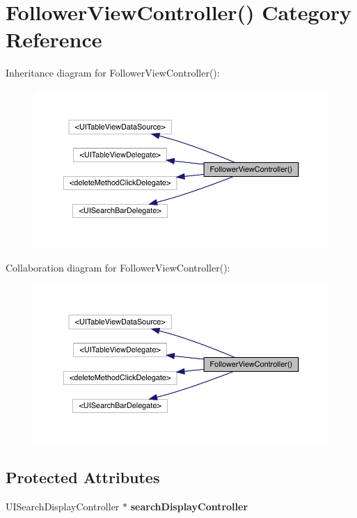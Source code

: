 \hypertarget{category_follower_view_controller_07_08}{}\section{Follower\+View\+Controller() Category Reference}
\label{category_follower_view_controller_07_08}


Inheritance diagram for Follower\+View\+Controller()\+:\nopagebreak
\begin{figure}[H]
\begin{center}
\leavevmode
\includegraphics[width=350pt]{category_follower_view_controller_07_08__inherit__graph}
\end{center}
\end{figure}


Collaboration diagram for Follower\+View\+Controller()\+:\nopagebreak
\begin{figure}[H]
\begin{center}
\leavevmode
\includegraphics[width=350pt]{category_follower_view_controller_07_08__coll__graph}
\end{center}
\end{figure}
\subsection*{Protected Attributes}
\begin{DoxyCompactItemize}
\item 
\mbox{\label{category_follower_view_controller_07_08_ace28c1a1171d3a0ad9a0ce826fa97e95}} 
U\+I\+Search\+Display\+Controller $\ast$ {\bfseries search\+Display\+Controller}
\end{DoxyCompactItemize}
